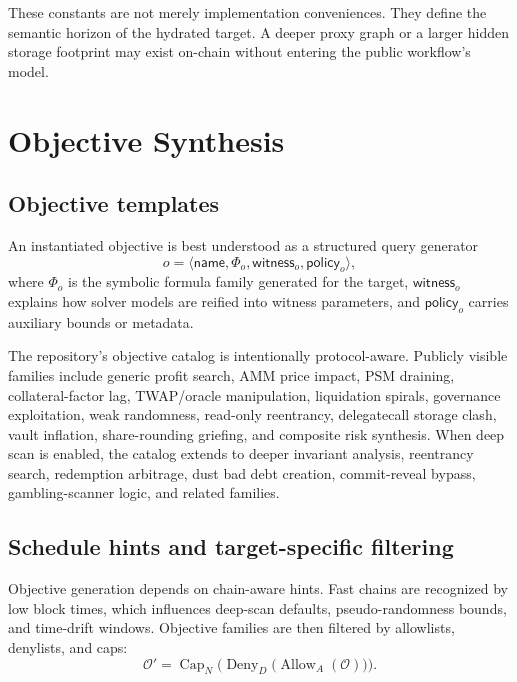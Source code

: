 \documentclass[11pt]{article}
\numberwithin{equation}{section}
\theoremstyle{remark}
\newcommand{\Objectives}{\mathcal{O}}
\begin{document}
These constants are not merely implementation conveniences. They define the semantic horizon of the hydrated target. A deeper proxy graph or a larger hidden storage footprint may exist on-chain without entering the public workflow's model.

\section{Objective Synthesis}
\label{sec:objectives}

\subsection{Objective templates}

An instantiated objective is best understood as a structured query generator
\begin{equation}
\label{eq:objective-template}
o
=
\langle
\mathsf{name},
\Phi_o,
\mathsf{witness}_o,
\mathsf{policy}_o
\rangle,
\end{equation}
where \(\Phi_o\) is the symbolic formula family generated for the target, \(\mathsf{witness}_o\) explains how solver models are reified into witness parameters, and \(\mathsf{policy}_o\) carries auxiliary bounds or metadata.

The repository's objective catalog is intentionally protocol-aware. Publicly visible families include generic profit search, AMM price impact, PSM draining, collateral-factor lag, TWAP/oracle manipulation, liquidation spirals, governance exploitation, weak randomness, read-only reentrancy, delegatecall storage clash, vault inflation, share-rounding griefing, and composite risk synthesis. When deep scan is enabled, the catalog extends to deeper invariant analysis, reentrancy search, redemption arbitrage, dust bad debt creation, commit-reveal bypass, gambling-scanner logic, and related families.

\subsection{Schedule hints and target-specific filtering}

Objective generation depends on chain-aware hints. Fast chains are recognized by low block times, which influences deep-scan defaults, pseudo-randomness bounds, and time-drift windows. Objective families are then filtered by allowlists, denylists, and caps:
\begin{equation}
\label{eq:objective-filter}
\Objectives'
=
\operatorname{Cap}_{N}
\Big(
\operatorname{Deny}_{D}
\big(
\operatorname{Allow}_{A}(\Objectives)
\big)
\Big).
\end{equation}
\end{document}

